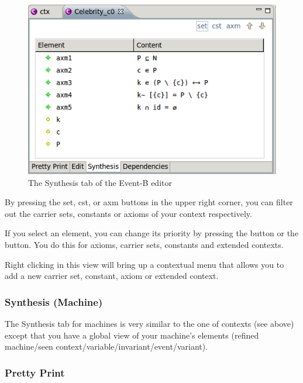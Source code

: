 \begin{figure}[!ht]
\begin{center}
	\includegraphics{img/reference/ref_01_eventb_editor11.png}
	\caption{The Synthesis tab of the Event-B editor}
	\label{fig_ref_01_eventb_editor11}
\end{center}
\end{figure}

By pressing the \textsf{set}, \textsf{cst}, or \textsf{axm} buttons in the upper right corner, you can filter out the carrier sets, constants or axioms of your context respectively.

If you select an element, you can change its priority by pressing the  button or the  button‎. You do this for axioms, carrier sets, constants and extended contexts.

Right clicking in this view will bring up a contextual menu that allows you to add a new carrier set, constant, axiom or extended context. 

\subsubsection{Synthesis (Machine)}

The \textsf{Synthesis} tab for machines is very similar to the one of contexts (see above) except that you have a global view of your machine's elements (refined machine/seen context/variable/invariant/event/variant).

\subsubsection{Pretty Print}

